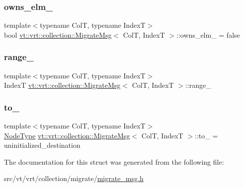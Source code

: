 \subsubsection{\texorpdfstring{owns\+\_\+elm\+\_\+}{owns\_elm\_}}
{\footnotesize\ttfamily template$<$typename ColT, typename IndexT$>$ \\
bool \hyperlink{structvt_1_1vrt_1_1collection_1_1_migrate_msg}{vt\+::vrt\+::collection\+::\+Migrate\+Msg}$<$ ColT, IndexT $>$\+::owns\+\_\+elm\+\_\+ = false\hspace{0.3cm}{\ttfamily [private]}}

\mbox{\label{structvt_1_1vrt_1_1collection_1_1_migrate_msg_aa5ae1696b48cdc6cfbc27cebe492b4be}} 
\subsubsection{\texorpdfstring{range\+\_\+}{range\_}}
{\footnotesize\ttfamily template$<$typename ColT, typename IndexT$>$ \\
IndexT \hyperlink{structvt_1_1vrt_1_1collection_1_1_migrate_msg}{vt\+::vrt\+::collection\+::\+Migrate\+Msg}$<$ ColT, IndexT $>$\+::range\+\_\+\hspace{0.3cm}{\ttfamily [private]}}

\mbox{\label{structvt_1_1vrt_1_1collection_1_1_migrate_msg_a8bb8dc33230f27eef17bc2beb07ab32a}} 
\subsubsection{\texorpdfstring{to\+\_\+}{to\_}}
{\footnotesize\ttfamily template$<$typename ColT, typename IndexT$>$ \\
\hyperlink{namespacevt_a866da9d0efc19c0a1ce79e9e492f47e2}{Node\+Type} \hyperlink{structvt_1_1vrt_1_1collection_1_1_migrate_msg}{vt\+::vrt\+::collection\+::\+Migrate\+Msg}$<$ ColT, IndexT $>$\+::to\+\_\+ = uninitialized\+\_\+destination\hspace{0.3cm}{\ttfamily [private]}}



The documentation for this struct was generated from the following file\+:\begin{DoxyCompactItemize}
\item 
src/vt/vrt/collection/migrate/\hyperlink{migrate__msg_8h}{migrate\+\_\+msg.\+h}\end{DoxyCompactItemize}
